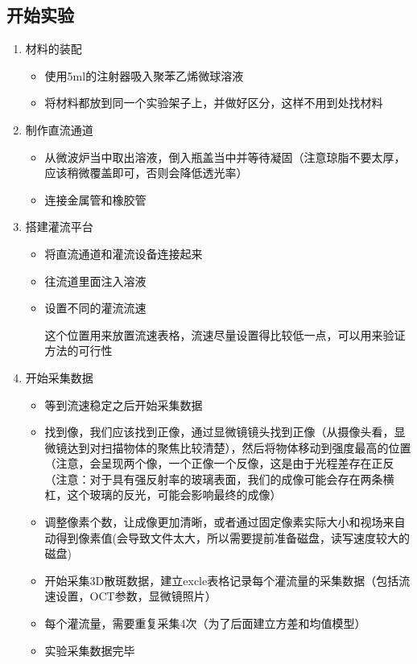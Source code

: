 \documentclass[12pt]{article}
\begin{document}
\subsection{开始实验}
\begin{enumerate}
    \item 材料的装配
    \begin{itemize}
   
    \item 使用5ml的注射器吸入聚苯乙烯微球溶液
    \item 将材料都放到同一个实验架子上，并做好区分，这样不用到处找材料
    
    \end{itemize}

    \item 制作直流通道
    \begin{itemize}
        \item 从微波炉当中取出溶液，倒入瓶盖当中并等待凝固（注意琼脂不要太厚，应该稍微覆盖即可，否则会降低透光率）
        \item 连接金属管和橡胶管
    \end{itemize}

    \item 搭建灌流平台
    \begin{itemize}
        
        \item 将直流通道和灌流设备连接起来
        \item 往流道里面注入溶液
        \item 设置不同的灌流流速
        
       这个位置用来放置流速表格，流速尽量设置得比较低一点，可以用来验证方法的可行性
        


    
    \end{itemize}

    \item 开始采集数据
    \begin{itemize}
        \item 等到流速稳定之后开始采集数据
        \item 找到像，我们应该找到正像，通过显微镜镜头找到正像（从摄像头看，显微镜达到对扫描物体的聚焦比较清楚），然后将物体移动到强度最高的位置（注意，会呈现两个像，一个正像一个反像，这是由于光程差存在正反
        （注意：对于具有强反射率的玻璃表面，我们的成像可能会存在两条横杠，这个玻璃的反光，可能会影响最终的成像）
        \item 调整像素个数，让成像更加清晰，或者通过固定像素实际大小和视场来自动得到像素值(会导致文件太大，所以需要提前准备磁盘，读写速度较大的磁盘)
        \item 开始采集3D散斑数据，建立excle表格记录每个灌流量的采集数据（包括流速设置，OCT参数，显微镜照片）
        \item 每个灌流量，需要重复采集4次（为了后面建立方差和均值模型）
        \item 实验采集数据完毕
    \end{itemize}


\end{enumerate}
\end{document}
